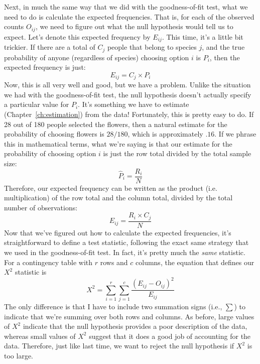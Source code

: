 Next, in much the same way that we did with the goodness-of-fit test, what we need to do is calculate the expected frequencies. That is, for each of the observed counts $O_{ij}$, we need to figure out what the null hypothesis would tell us to expect. Let's denote this expected frequency by $E_{ij}$. This time, it's a little bit trickier. If there are a total of $C_j$ people that belong to species $j$, and the true probability of anyone (regardless of species) choosing option $i$ is $P_i$, then the expected frequency is just: 
$$
E_{ij} = C_j \times P_i
$$
Now, this is all very well and good, but we have a problem. Unlike the situation we had with the goodness-of-fit test, the null hypothesis doesn't actually specify a particular value for $P_i$. It's something we have to estimate (Chapter~\ref{ch:estimation}) from the data! Fortunately, this is pretty easy to do. If 28 out of 180 people selected the flowers, then a natural estimate for the probability of choosing flowers is $28/180$, which is approximately $.16$. If we phrase this in mathematical terms, what we're saying is that our estimate for the probability of choosing option $i$ is just the row total divided by the total sample size:
$$
\hat{P}_i = \frac{R_i}{N}
$$
Therefore, our expected frequency can be written as the product (i.e. multiplication) of the row total and the column total, divided by the total number of observations:
$$
E_{ij} = \frac{R_i \times C_j}{N}
$$
Now that we've figured out how to calculate the expected frequencies, it's straightforward to define a test statistic, following the exact same strategy that we used in the goodness-of-fit test. In fact, it's pretty much the {\it same} statistic. For a contingency table with $r$ rows and $c$ columns, the equation that defines our $X^2$ statistic is 
$$
X^2 = \sum_{i=1}^r\sum_{j=1}^c \frac{({E}_{ij} - O_{ij})^2}{{E}_{ij}}
$$
The only difference is that I have to include two summation signs (i.e., $\sum$) to indicate that we're summing over both rows and columns. As before, large values of $X^2$ indicate that the null hypothesis provides a poor description of the data, whereas small values of $X^2$ suggest that it does a good job of accounting for the data. Therefore, just like last time, we want to reject the null hypothesis if $X^2$ is too large.

